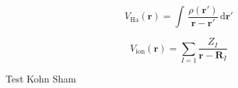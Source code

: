 \begin{equation}
V_{\mathrm{Ha}}(\mathbf{r}) = \int\, \frac{\rho(\mathbf{r}')}{\mathbf{r} - \mathbf{r}'}\,\mathrm{d}\mathbf{r}'
\end{equation}

\begin{equation}
V_{\mathrm{ion}}(\mathbf{r}) = \sum_{I=1} \frac{Z_{I}}{\mathbf{r} - \mathbf{R}_{I}}
\end{equation}



\begin{thebibliography}{99.}%
 Test Kohn Sham
\end{thebibliography}
